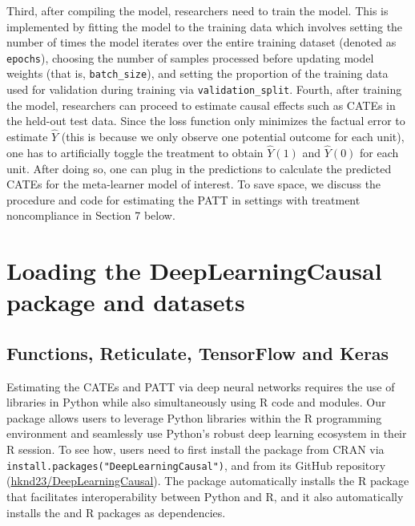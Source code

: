 Third, after compiling the model, researchers need to train the model.
This is implemented by fitting the model to the training data which
involves setting the number of times the model iterates over the entire
training dataset (denoted as \texttt{epochs}), choosing the number of samples
processed before updating model weights (that is, \texttt{batch\_size}), and
setting the proportion of the training data used for validation during
training via \texttt{validation\_split}. Fourth, after training the model,
researchers can proceed to estimate causal effects such as CATEs in the
held-out test data. Since the loss function only minimizes the factual
error to estimate \(\hat{Y}\) (this is because we only observe one
potential outcome for each unit), one has to artificially toggle the
treatment to obtain \(\hat{Y}(1)\) and \(\hat{Y}(0)\) for each unit. After
doing so, one can plug in the predictions to calculate the predicted
CATEs for the meta-learner model of interest. To save space, we discuss
the procedure and code for estimating the PATT in settings with
treatment noncompliance in Section 7 below.

\section{Loading the DeepLearningCausal package and datasets}\label{loading-the-deeplearningcausal-package-and-datasets}

\subsection{Functions, Reticulate, TensorFlow and Keras}\label{functions-reticulate-tensorflow-and-keras}

Estimating the CATEs and PATT via deep neural networks requires the use
of libraries in Python while also simultaneously using R code and
modules. Our  package allows users to leverage
Python libraries within the R programming environment and seamlessly use
Python's robust deep learning ecosystem in their R session. To see how,
users need to first install the  package from
CRAN via \texttt{install.packages("DeepLearningCausal")}, and from its GitHub
repository
(\href{https://github.com/hknd23/DeepLearningCausal}{hknd23/DeepLearningCausal}).
The  package automatically installs the
 R package that facilitates interoperability between
Python and R, and it also automatically installs the 
and  R packages as dependencies.

